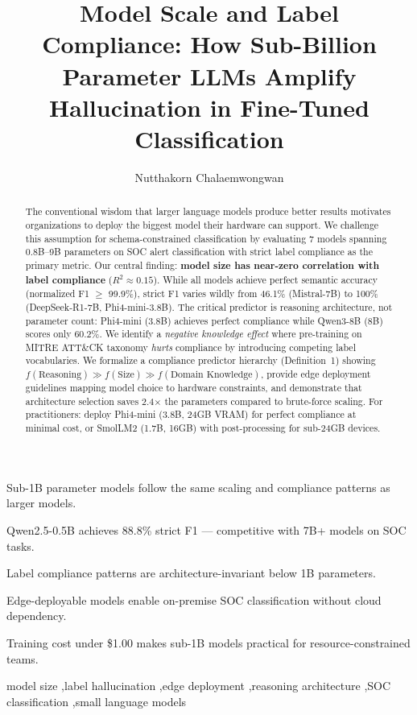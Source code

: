 \documentclass[review,3p]{elsarticle}
\begin{document}
\title{Model Scale and Label Compliance: How Sub-Billion Parameter LLMs Amplify Hallucination in Fine-Tuned Classification}
\author[kmitl]{Nutthakorn Chalaemwongwan}
\address[kmitl]{Department of Computer Engineering, KOSEN-KMITL, King Mongkut's Institute of Technology Ladkrabang, Bangkok, Thailand}
\begin{frontmatter}

\begin{highlights}
\item Sub-1B parameter models follow the same scaling and compliance patterns as larger models.
\item Qwen2.5-0.5B achieves 88.8\% strict F1 --- competitive with 7B+ models on SOC tasks.
\item Label compliance patterns are architecture-invariant below 1B parameters.
\item Edge-deployable models enable on-premise SOC classification without cloud dependency.
\item Training cost under \$1.00 makes sub-1B models practical for resource-constrained teams.
\end{highlights}



\begin{abstract}
The conventional wisdom that larger language models produce better results motivates organizations to deploy the biggest model their hardware can support. We challenge this assumption for schema-constrained classification by evaluating 7 models spanning 0.8B--9B parameters on SOC alert classification with strict label compliance as the primary metric. Our central finding: \textbf{model size has near-zero correlation with label compliance} ($R^2 \approx 0.15$). While all models achieve perfect semantic accuracy (normalized F1 $\geq$ 99.9\%), strict F1 varies wildly from 46.1\% (Mistral-7B) to 100\% (DeepSeek-R1-7B, Phi4-mini-3.8B). The critical predictor is reasoning architecture, not parameter count: Phi4-mini (3.8B) achieves perfect compliance while Qwen3-8B (8B) scores only 60.2\%. We identify a \emph{negative knowledge effect} where pre-training on MITRE ATT\&CK taxonomy \emph{hurts} compliance by introducing competing label vocabularies. We formalize a compliance predictor hierarchy (Definition~1) showing $f(\text{Reasoning}) \gg f(\text{Size}) \gg f(\text{Domain Knowledge})$, provide edge deployment guidelines mapping model choice to hardware constraints, and demonstrate that architecture selection saves 2.4$\times$ the parameters compared to brute-force scaling. For practitioners: deploy Phi4-mini (3.8B, 24GB VRAM) for perfect compliance at minimal cost, or SmolLM2 (1.7B, 16GB) with post-processing for sub-24GB devices.
\end{abstract}

\begin{keyword}
model size \sep label hallucination \sep edge deployment \sep reasoning architecture \sep SOC classification \sep small language models
\end{keyword}

\end{frontmatter}
\end{document}
